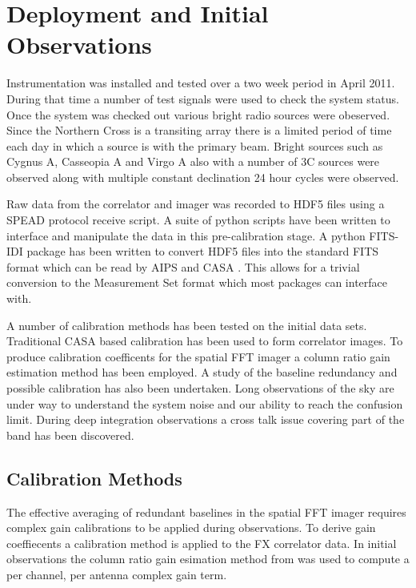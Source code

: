 \documentclass[useAMS,macros,usenatbib,onecolumn]{mn2e}
\begin{document}
\section{Deployment and Initial Observations}
\label{observations}

Instrumentation was installed and tested over a two week period in April 2011.
During that time a number of test signals were used to check the system status.
Once the system was checked out various bright radio sources were obeserved.
Since the Northern Cross is a transiting array there is a limited period of time each day in which a source is with the primary beam.
Bright sources such as Cygnus A, Casseopia A and Virgo A also with a number of 3C sources were observed along with multiple constant declination 24 hour cycles were observed.

Raw data from the correlator and imager was recorded to HDF5 files using a SPEAD protocol receive script.
A suite of python scripts have been written to interface and manipulate the data in this pre-calibration stage.
A python FITS-IDI package has been written to convert HDF5 files into the standard FITS format which can be read by AIPS and CASA \citep{}.
This allows for a trivial conversion to the Measurement Set format which most packages can interface with.

A number of calibration methods has been tested on the initial data sets.
Traditional CASA based calibration has been used to form correlator images.
To produce calibration coefficents for the spatial FFT imager a column ratio gain estimation method has been employed.
A study of the baseline redundancy and possible calibration has also been undertaken.
Long observations of the sky are under way to understand the system noise and our ability to reach the confusion limit.
During deep integration observations a cross talk issue covering part of the band has been discovered.

\subsection{Calibration Methods}
\label{calibration}

The effective averaging of redundant baselines in the spatial FFT imager requires complex gain calibrations to be applied during observations.
To derive gain coeffiecents a calibration method is applied to the FX correlator data.
In initial observations the column ratio gain esimation method from \citep{gaindecomp} was used to compute a per channel, per antenna complex gain term.
\end{document}
